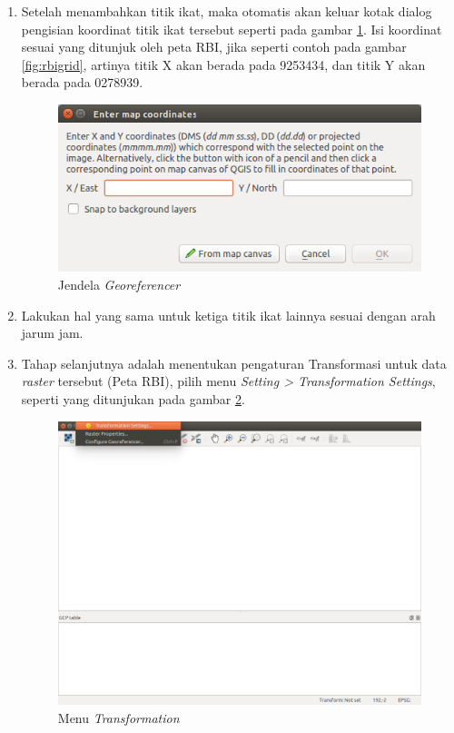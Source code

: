\begin{enumerate}[1.]
  \item Setelah menambahkan titik ikat, maka otomatis akan keluar kotak dialog pengisian koordinat titik ikat tersebut seperti pada gambar \ref{fig:jendelatitikikat}. Isi koordinat sesuai yang ditunjuk oleh peta RBI, jika seperti contoh pada gambar \ref{fig:rbigrid}, artinya titik X akan berada pada 9253434, dan titik Y akan berada pada 0278939.
  
  \begin{figure}[H]
    \centering
    \includegraphics[width=1\textwidth]{./resources/032-jendela-georeferencer}
    \caption{Jendela \textit{Georeferencer}}
    \label{fig:jendelatitikikat}
  \end{figure}
  
  \item Lakukan hal yang sama untuk ketiga titik ikat lainnya sesuai dengan arah jarum jam.
  
  \item Tahap selanjutnya adalah menentukan pengaturan Transformasi untuk data \textit{raster} tersebut (Peta RBI), pilih menu \textit{Setting > Transformation Settings}, seperti yang ditunjukan pada gambar \ref{fig:transformationmenu}.
  
  \begin{figure}[H]
    \centering
    \includegraphics[width=1\textwidth]{./resources/033-menu-transformation}
    \caption{Menu \textit{Transformation}}
    \label{fig:transformationmenu}
  \end{figure}
  

\end{enumerate}
